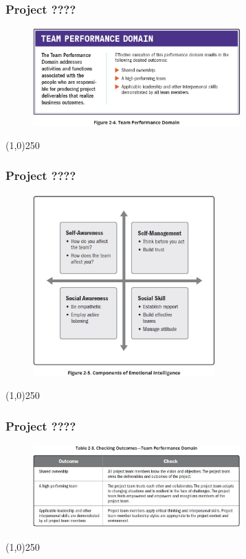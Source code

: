 \begin{frame}
\frametitle{Project ????}
 \begin{figure}
    \centering
        \includegraphics[width = 8cm]{../images/guide/Fig2-4.jpg}
    \label{guidefig:2-4}
 \end{figure}
\end{frame}
\begin{center}\line(1,0){250}\end{center}

\begin{frame}
\frametitle{Project ????}
 \begin{figure}
    \centering
        \includegraphics[width = 7cm]{../images/guide/Fig2-5.jpg}
    \label{guidefig:2-5}
 \end{figure}
\end{frame}
\begin{center}\line(1,0){250}\end{center}

\begin{frame}
\frametitle{Project ????}
 \begin{figure}
    \centering
        \includegraphics[width = 8cm]{../images/guide/Table2-3.jpg}
    \label{guideTable:2-3}
 \end{figure}
\end{frame}
\begin{center}\line(1,0){250}\end{center}





